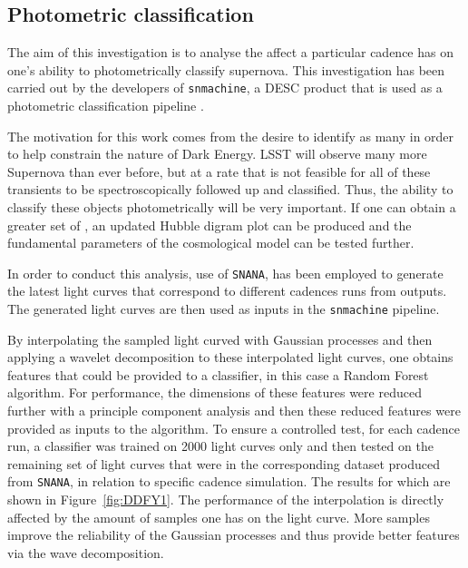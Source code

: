 \subsection{Photometric classification}


The aim of this investigation is to analyse the affect a particular cadence has
on one's ability to photometrically classify supernova. This investigation has been carried out by the
developers of {\tt snmachine}, a DESC product that is used as a photometric
classification pipeline \cite{lochner2016photometric}.

The motivation for this work comes from the desire to identify as many \sne in
order to help constrain the nature of Dark Energy.
LSST will observe many more Supernova than ever before, but at a rate that is
not feasible for all of these transients to be spectroscopically followed up and
classified. Thus, the ability to classify these objects photometrically will be very
important. If one can obtain a greater set of \sne, an updated Hubble
digram plot can be produced and the fundamental parameters of the cosmological
model can be tested further.

In order to conduct this analysis, use of
{\tt SNANA}\cite{kessler2009snana}, has been employed to generate the latest light curves that
correspond to different cadences runs from \opsim outputs. The generated light
curves are then used as inputs in the {\tt snmachine} pipeline.

By interpolating the sampled light curved with Gaussian processes and then
applying a wavelet decomposition to these interpolated light curves, one obtains features
that could be provided to a classifier, in this case a Random Forest algorithm.
For performance, the dimensions of these features were reduced further with a principle
component analysis and then these reduced features were provided as inputs to the algorithm.
To ensure a controlled test,
for each cadence run, a classifier was trained on 2000 light
curves only and then tested on the remaining set of light curves that were in the
corresponding dataset produced from {\tt SNANA}, in relation to specific
\opsim cadence simulation. The results for which are shown in
Figure~\ref{fig:DDFY1}.
The performance of the interpolation is directly affected by the amount of
samples one has on the light curve. More samples improve the reliability of the
Gaussian processes and thus provide better features via the wave
decomposition.

